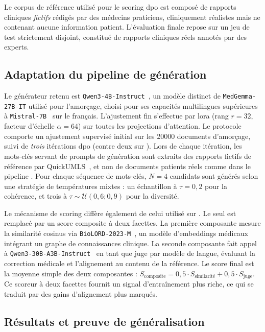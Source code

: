 Le corpus de référence utilisé pour le scoring \gls{dpo} est composé de rapports cliniques \emph{fictifs} rédigés par des médecins praticiens, cliniquement réalistes mais ne contenant aucune information patient.
L'évaluation finale repose sur un jeu de test strictement disjoint, constitué de rapports cliniques réels annotés par des experts.

\subsection{Adaptation du pipeline de génération}

Le générateur retenu est \verb|Qwen3-4B-Instruct|~\citep{yang2025qwen3}, un modèle distinct de \verb|MedGemma-27B-IT| utilisé pour l'amorçage, choisi pour ses capacités multilingues supérieures à \verb|Mistral-7B|~\citep{jiangMistral7B2023} sur le français.
L'ajustement fin s'effectue par \gls{lora} (rang $r=32$, facteur d'échelle $\alpha=64$) sur toutes les projections d'attention.
Le protocole comporte un ajustement supervisé initial sur les \num{20000} documents d'amorçage, suivi de \emph{trois} itérations \gls{dpo} (contre deux sur \mimic{}).
Lors de chaque itération, les mots-clés servant de prompts de génération sont extraits des rapports fictifs de référence par QuickUMLS~\citep{soldainiQuickUMLSFastUnsupervised2016}, et non de documents patients réels comme dans le pipeline \mimic{}.
Pour chaque séquence de mots-clés, $N=4$ candidats sont générés selon une stratégie de températures mixtes : un échantillon à $\tau = 0{,}2$ pour la cohérence, et trois à $\tau \sim \mathcal{U}(0{,}6 ; 0{,}9)$ pour la diversité.

Le mécanisme de scoring diffère également de celui utilisé sur \mimic{}.
Le \score{} seul est remplacé par un score composite à deux facettes.
La première composante mesure la similarité cosinus via \verb|BioLORD-2023-M|~\citep{remy2024biolord}, un modèle d'embeddings médicaux intégrant un graphe de connaissances clinique.
La seconde composante fait appel à \verb|Qwen3-30B-A3B-Instruct|~\citep{yang2025qwen3} en tant que juge par modèle de langue, évaluant la correction médicale et l'alignement au contenu de la référence.
Le score final est la moyenne simple des deux composantes : $S_{\text{composite}} = 0{,}5 \cdot S_{\text{similarité}} + 0{,}5 \cdot S_{\text{juge}}$.
Ce scoreur à deux facettes fournit un signal d'entraînement plus riche, ce qui se traduit par des gains d'alignement plus marqués.

\subsection{Résultats et preuve de généralisation}

